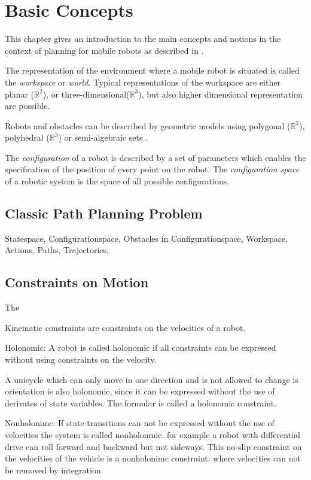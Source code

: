\chapter{Basic Concepts}\label{ch:introductionplanning}
This chapter gives an introduction to the main concepts and notions in the context of planning for mobile robots as described in \cite{Choset_2005_5167}\cite{LaValle2006}.

The representation of the environment where a mobile robot is situated is called the \emph{workspace} or \emph{world}.
Typical representations of the workspace are either planar ($\mathbb{R}^2$), or three-dimensional($\mathbb{R}^3$), but also higher dimensional representation are possible.

Robots and obstacles can be described by geometric models using polygonal ($\mathbb{R}^2$), polyhedral ($\mathbb{R}^3$) or semi-algebraic sets \cite{LaValle2006}.

The \emph{configuration} of a robot is described by a set of parameters which enables the specification of the position of every point on the robot. The \emph{configuration space} of a robotic system is the space of all possible configurations.

  


\section{Classic Path Planning Problem}\label{sec:basic}
Statespace,
Configurationspace,
Obstacles in Configurationspace,
Workspace,
Actions,
Paths,
Trajectories,

\section{Constraints on Motion}\label{sec:model}
The 

Kinematic constraints are constraints on the velocities of a robot.


Holonomic:
A robot is called holonomic if all constraints can be expressed without using constraints on the velocity. 

A unicycle which can only move in one direction and is not allowed to change is orientation is also holonomic, since  it can be expressed without the use of derivates of state variables.
The formular is called a holonomic constraint.

Nonholonimc:
If state transitions can not be expressed without the use of velocities the system is called nonholonmic.
for example a robot with differential drive can roll forward and backward but not sideways. 
This no-slip constraint on the velocities of the vehicle is a nonholonimc constraint.
where velocities can not be removed by integration 

